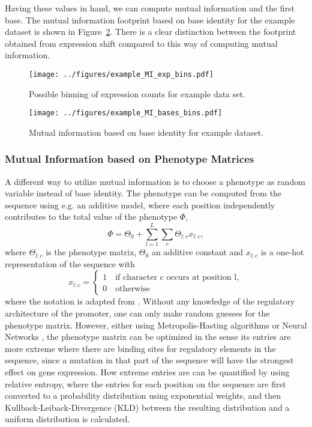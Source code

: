 Having these values in hand, we can compute mutual information and the first base. The mutual information footprint based on base identity for the example dataset is shown in Figure~\ref{fig:SI_MI_base_ident}. There is a clear distinction between the footprint obtained from expression shift compared to this way of computing mutual information. 
\fi
\begin{figure}
    \texttt{[image: ../figures/example\_MI\_exp\_bins.pdf]}
    \caption{Possible binning of expression counts for example data set. }
    \label{fig:SI_MI_exp_bins}
\end{figure}
\begin{figure}
    \texttt{[image: ../figures/example\_MI\_bases\_bins.pdf]}
    \caption{Mutual information based on base identity for example dataset. }
    \label{fig:SI_MI_base_ident}
\end{figure}
\subsubsection{Mutual Information based on Phenotype Matrices}
A different way to utilize mutual information is to choose a phenotype as random variable instead of base identity. The phenotype can be computed from the sequence using e.g. an additive model, where each position independently contributes to the total value of the phenotype $\Phi$,
\begin{equation}
    \Phi = \Theta_0 + \sum_{l=1}^{L}\sum_c \Theta_{l:c}x_{l:c},
\end{equation}
where $\Theta_{l:c}$ is the phenotype matrix, $\Theta_0$ an additive constant and $x_{l:c}$ is a one-hot representation of the sequence with
\begin{equation}
    x_{l:c}=\begin{cases}
        1\quad\text{if character c occurs at position l},\\
        0\quad\text{otherwise}
    \end{cases}
\end{equation}
where the notation is adapted from \cite{tareen2022mave}. Without any knowledge of the regulatory architecture of the promoter, one can only make random guesses for the phenotype matrix. However, either using Metropolis-Hasting algorithms  or Neural Networks , the phenotype matrix can be optimized in the sense its entries are more extreme where there are binding sites for regulatory elements in the sequence, since a mutation in that part of the sequence will have the strongest effect on gene expression. How extreme entries are can be quantified by using relative entropy, where the entries for each position on the sequence are first converted to a probability distribution using exponential weights, and then Kullback-Leiback-Divergence (KLD) between the resulting distribution and a uniform distribution is calculated. 
 
